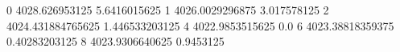 0 4028.626953125 5.6416015625
1 4026.0029296875 3.017578125
2 4024.431884765625 1.446533203125
4 4022.9853515625 0.0
6 4023.38818359375 0.40283203125
8 4023.9306640625 0.9453125
